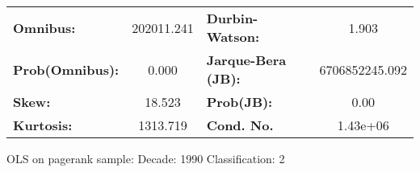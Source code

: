 \begin{center}
\begin{tabular}{lccccc}
\bottomrule
\end{tabular}
\begin{tabular}{lclc}
\textbf{Omnibus:}       & 202011.241 & \textbf{  Durbin-Watson:     } &       1.903     \\
\textbf{Prob(Omnibus):} &    0.000   & \textbf{  Jarque-Bera (JB):  } & 6706852245.092  \\
\textbf{Skew:}          &   18.523   & \textbf{  Prob(JB):          } &        0.00     \\
\textbf{Kurtosis:}      &  1313.719  & \textbf{  Cond. No.          } &    1.43e+06     \\
\bottomrule
\end{tabular}
\end{center}
\break
OLS on pagerank sample: Decade: 1990 Classification: 2
